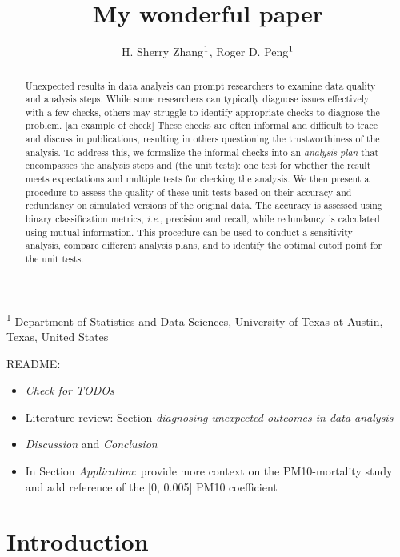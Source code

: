 \documentclass[
  12pt,
]{interact}
\title{My wonderful paper}
\author{H. Sherry Zhang$\textsuperscript{1}$, Roger D.
Peng$\textsuperscript{1}$}
\providecommand{\tightlist}{%
  \setlength{\itemsep}{0pt}\setlength{\parskip}{0pt}}\usepackage{longtable,booktabs,array}
\begin{document}
\captionsetup{labelsep=space}
\maketitle
\textsuperscript{1} Department of Statistics and Data
Sciences, University of Texas at Austin, Texas, United States
\begin{abstract}
Unexpected results in data analysis can prompt researchers to examine
data quality and analysis steps. While some researchers can typically
diagnose issues effectively with a few checks, others may struggle to
identify appropriate checks to diagnose the problem. {[}an example of
check{]} These checks are often informal and difficult to trace and
discuss in publications, resulting in others questioning the
trustworthiness of the analysis. To address this, we formalize the
informal checks into an \emph{analysis plan} that encompasses the
analysis steps and (the unit tests): one test for whether the result
meets expectations and multiple tests for checking the analysis. We then
present a procedure to assess the quality of these unit tests based on
their accuracy and redundancy on simulated versions of the original
data. The accuracy is assessed using binary classification metrics,
\emph{i.e.}, precision and recall, while redundancy is calculated using
mutual information. This procedure can be used to conduct a sensitivity
analysis, compare different analysis plans, and to identify the optimal
cutoff point for the unit tests.
\end{abstract}


README:

\begin{itemize}
\tightlist
\item
  \emph{Check for TODOs}
\item
  Literature review: Section \emph{diagnosing unexpected outcomes in
  data analysis}
\item
  \emph{Discussion} and \emph{Conclusion}
\item
  In Section \emph{Application}: provide more context on the
  PM10-mortality study and add reference of the {[}0, 0.005{]} PM10
  coefficient
\end{itemize}

\newpage

\section{Introduction}\label{introduction}
\end{document}
